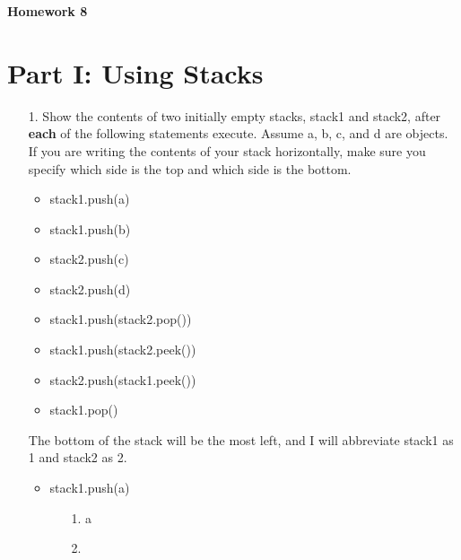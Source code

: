 \documentclass[10pt]{article}
\begin{document}
\begin{center}
	\textbf{\large{Homework 8}}
\end{center}

\section{Part I: Using Stacks}
	
	\begin{enumerate}
		\item[1.] Show the contents of two initially empty stacks, stack1 and stack2, after \textbf{each} of the following statements execute. Assume a, b, c, and d are objects. If you are writing the contents of your stack horizontally, make sure you specify which side is the top and which side is the bottom.
			
			\begin{itemize}
				\item stack1.push(a)
				
				\item stack1.push(b)
				
				\item stack2.push(c)
				
				\item stack2.push(d)
				
				\item stack1.push(stack2.pop())
				
				\item stack1.push(stack2.peek())
				
				\item stack2.push(stack1.peek())
				
				\item stack1.pop()
			\end{itemize}
			
			\vspace{0.5cm}
			The bottom of the stack will be the most left, and I will abbreviate stack1 as 1 and stack2 as 2.
			
			\begin{itemize}
				\item stack1.push(a)
					
					\begin{enumerate}
						
						\item[1.] a
						
						\item[2.]
					
					\end{enumerate}
				

\end{itemize}
\end{enumerate}
\end{document}
